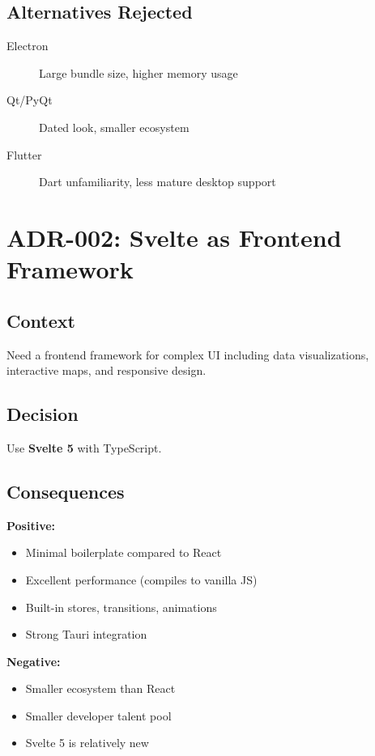 \subsection{Alternatives Rejected}

\begin{description}
    \item[Electron] Large bundle size, higher memory usage
    \item[Qt/PyQt] Dated look, smaller ecosystem
    \item[Flutter] Dart unfamiliarity, less mature desktop support
\end{description}

\section{ADR-002: Svelte as Frontend Framework}

\subsection{Context}
Need a frontend framework for complex UI including data visualizations, interactive maps, and responsive design.

\subsection{Decision}
Use \textbf{Svelte 5} with TypeScript.

\subsection{Consequences}

\textbf{Positive:}
\begin{itemize}
    \item Minimal boilerplate compared to React
    \item Excellent performance (compiles to vanilla JS)
    \item Built-in stores, transitions, animations
    \item Strong Tauri integration
\end{itemize}

\textbf{Negative:}
\begin{itemize}
    \item Smaller ecosystem than React
    \item Smaller developer talent pool
    \item Svelte 5 is relatively new
\end{itemize}

